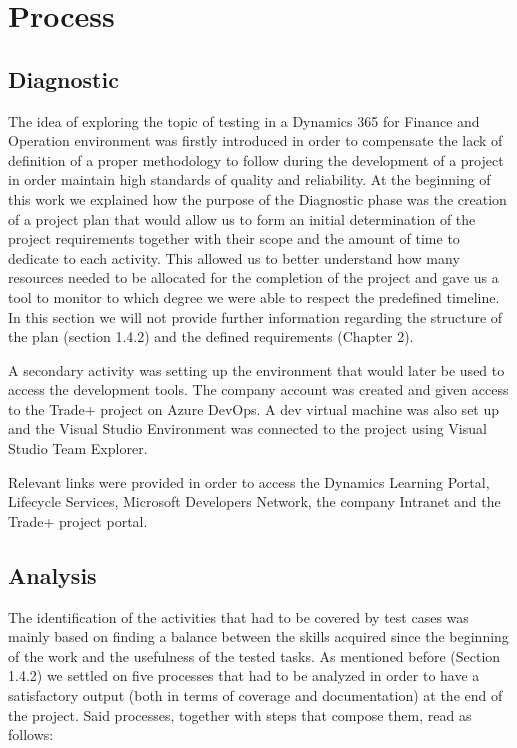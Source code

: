 \chapter{Process}

\section{Diagnostic} 

The idea of exploring the topic of testing in a Dynamics 365 for Finance and Operation environment was firstly introduced in order to compensate the lack of definition of a proper methodology to follow during the development of a project in order maintain high standards of quality and reliability. 
At the beginning of this work we explained how the purpose of the Diagnostic phase was the creation of a project plan that would allow us to form an initial determination of the project requirements together with their scope and the amount of time to dedicate to each activity. This allowed us to better understand how many resources needed to be allocated for the completion of the project and gave us a tool to monitor to which degree we were able to respect the predefined timeline. In this section we will not provide further information regarding the structure of the plan (section 1.4.2) and the defined requirements (Chapter 2).

A secondary activity was setting up the environment that would later be used to access the development tools. The company account was created and given access to the Trade+ project on Azure DevOps. A dev virtual machine was also set up and the Visual Studio Environment was connected to the project using Visual Studio Team Explorer.

Relevant links were provided in order to access the Dynamics Learning Portal, Lifecycle Services, Microsoft Developers Network, the company Intranet and the Trade+ project portal.

\section{Analysis} 

The identification of the activities that had to be covered by test cases was mainly based on finding a balance between the skills acquired since the beginning of the work and the usefulness of the tested tasks. As mentioned before (Section 1.4.2) we settled on five processes that had to be analyzed in order to have a satisfactory output (both in terms of coverage and documentation) at the end of the project. Said processes, together with steps that compose them, read as follows:

